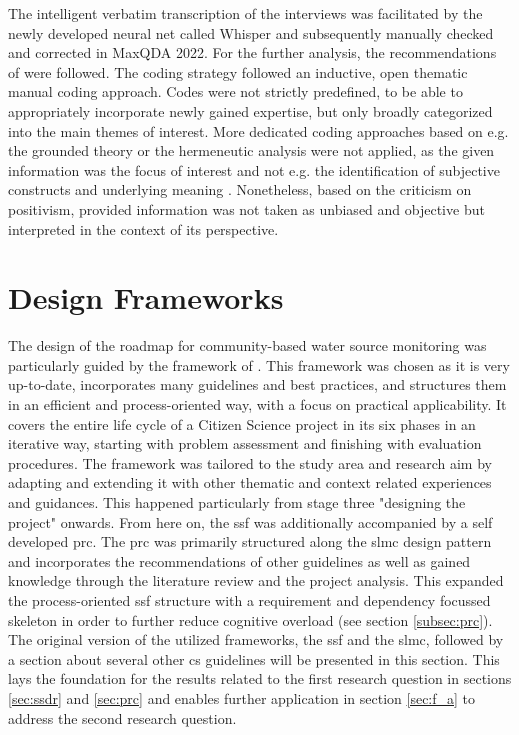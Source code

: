 The intelligent verbatim transcription of the interviews was facilitated by the newly developed neural net called Whisper \autocite{openaiIntroducingWhisper2022,openaiWhisper2023} and subsequently manually checked and corrected in MaxQDA 2022. For the further analysis, the recommendations of \autocite{radikerFocusedAnalysisQualitative2020} were followed. The coding strategy followed an inductive, open thematic manual coding approach. Codes were not strictly predefined, to be able to appropriately incorporate newly gained expertise, but only broadly categorized into the main themes of interest. More dedicated coding approaches based on e.g. the grounded theory or the hermeneutic analysis were not applied, as the given information was the focus of interest and not e.g. the identification of subjective constructs and underlying meaning \autocite{pelzResearchMethodsSocial}. Nonetheless, based on the criticism on positivism, provided information was not taken as unbiased and objective but interpreted in the context of its perspective.


\section{Design Frameworks}\label{sec:design_framework}

The design of the roadmap for community-based water source monitoring was particularly guided by the framework of \autocite{fraislCitizenScienceEnvironmental2022}. This framework was chosen as it is very up-to-date, incorporates many guidelines and best practices, and structures them in an efficient and process-oriented way, with a focus on practical applicability. It covers the entire life cycle of a Citizen Science project in its six phases in an iterative way, starting with problem assessment and finishing with evaluation procedures.\newline
The framework was tailored to the study area and research aim by adapting and extending it with other thematic and context related experiences and guidances. This happened particularly from stage three "designing the project" onwards. From here on, the \acrshort{ssf} was additionally accompanied by a self developed \acrfull{prc}. The \acrshort{prc} was primarily structured along the \acrlong{slmc} design pattern and incorporates the recommendations of other guidelines as well as gained knowledge through the literature review and the project analysis. This expanded the process-oriented \acrshort{ssf} structure with a requirement and dependency focussed skeleton in order to further reduce cognitive overload (see section \ref{subsec:prc}).\newline
The original version of the utilized frameworks, the \acrshort{ssf} and the \acrshort{slmc}, followed by a section about several other \acrshort{cs} guidelines will be presented in this section. This lays the foundation for the results related to the first research question in sections \ref{sec:ssdr} and \ref{sec:prc} and enables further application in section \ref{sec:f_a} to address the second research question.

